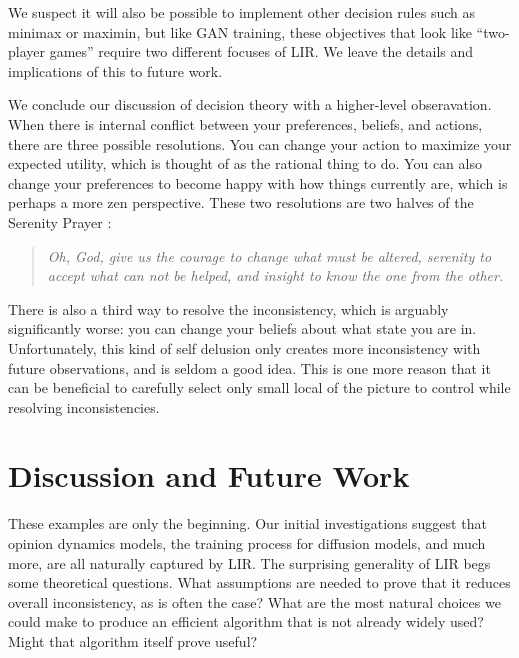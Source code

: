 {We suspect it will also be possible to implement other decision rules such as minimax or maximin, but like GAN training, these objectives that look like ``two-player games'' require two different focuses of LIR. 
We leave the details and implications of this to future work.

We conclude our discussion of decision theory with a higher-level obseravation. 
When there is internal conflict between your preferences, beliefs, and actions, there are three possible resolutions.  You can change your action to maximize your expected utility, which is thought of as the rational thing to do.
You can also change your preferences to become happy with how things currently are, which is perhaps a more zen perspective. 
These two resolutions are two halves of the Serenity Prayer \citep{serenity-prayer}:

\begin{quotation}\it
    Oh, God, give us the courage to change what must be altered, serenity to accept what can not be helped, and insight to know the one from the other.
\end{quotation}

There is also a third way to resolve the inconsistency, which is arguably significantly worse: you can change your beliefs about what state you are in. 
Unfortunately, this kind of self delusion only creates more inconsistency with future observations, and is seldom a good idea.  
This is one more reason that it can be beneficial to carefully select only small local of the picture to control while resolving inconsistencies.
}%


\section{Discussion and Future Work}

These examples are only the beginning.
Our initial investigations suggest that
opinion dynamics models,
the training process for diffusion models,
and much more, are all naturally captured by LIR.
%
The surprising generality of LIR begs some theoretical questions.
What assumptions are needed to prove that it reduces overall inconsistency,
    as is often the case?
What are the most natural choices we could make to produce an efficient
    algorithm that is not already widely used?
    Might that algorithm itself prove useful?

